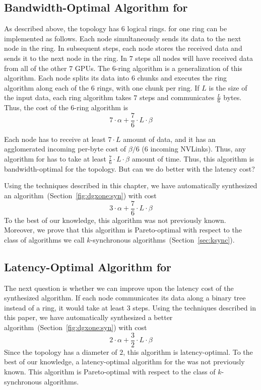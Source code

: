 \subsection{Bandwidth-Optimal Algorithm for \dgxone}
\label{sec:motivation:bw-optimal}
As described above, the \dgxone topology has $6$ logical rings. \allgather for one ring can be implemented as follows. Each node simultaneously sends its data to the next node in the ring. In subsequent steps, each node stores the received data and sends it to the next node in the ring. In $7$ steps all nodes will have received data from all of the other $7$ GPUs. The $6$-ring algorithm is a generalization of this algorithm. Each node splits its data into $6$ chunks and executes the ring algorithm along each of the $6$ rings, with one chunk per ring. If $L$ is the size of the input data, each ring algorithm takes $7$ steps and communicates $\frac{L}{6}$ bytes. Thus, the cost of the $6$-ring algorithm is
$$7\cdot \alpha + \frac{7}{6}\cdot L \cdot \beta$$

Each node has to receive at least $7 \cdot L$ amount of data, and it has an agglomerated incoming per-byte cost of $\beta/6$ (6 incoming NVLinks). Thus, any algorithm for \allgather has to take at least $\frac{7}{6}\cdot L \cdot \beta$ amount of time. Thus, this algorithm is bandwidth-optimal for the \dgxone topology. But can we do better with the latency cost?

Using the techniques described in this chapter, we have automatically synthesized an algorithm~(Section~\ref{fig:dgxone:syn}) with cost $$3\cdot \alpha + \frac{7}{6}\cdot L \cdot \beta$$ To the best of our knowledge, this algorithm was not previously known. Moreover, we prove that this algorithm is Pareto-optimal with respect to the class of algorithms we call $k$-synchronous algorithms~(Section~\ref{sec:ksync}).

\subsection{Latency-Optimal Algorithm for \dgxone}
The next question is whether we can improve upon the latency cost of the synthesized algorithm. If each node communicates its data along a binary tree instead of a ring, it would take at least $3$ steps. Using the techniques described in this paper, we have automatically synthesized a better algorithm~(Section~\ref{fig:dgxone:syn}) with cost $$2\cdot \alpha + \frac{3}{2}\cdot L \cdot \beta$$
Since the \dgxone topology has a diameter of $2$, this algorithm is latency-optimal. To the best of our knowledge, a latency-optimal algorithm for the \dgxone was not previously known. This algorithm is Pareto-optimal with respect to the class of $k$-synchronous algorithms.



